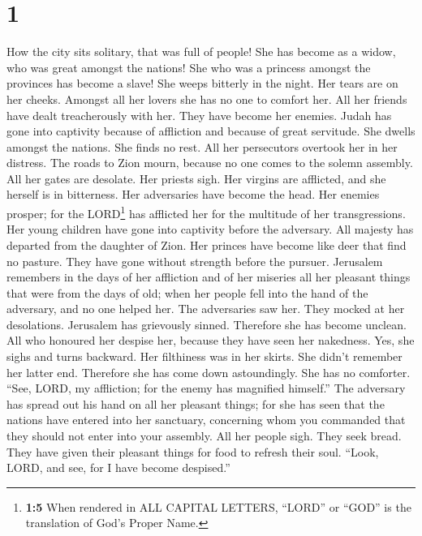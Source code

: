 \hypertarget{section}{%
\section{1}\label{section}}

 How the city sits solitary, that was full of people! She
has become as a widow, who was great amongst the nations! She who was a
princess amongst the provinces has become a slave!  She
weeps bitterly in the night. Her tears are on her cheeks. Amongst all
her lovers she has no one to comfort her. All her friends have dealt
treacherously with her. They have become her enemies. 
Judah has gone into captivity because of affliction and because of great
servitude. She dwells amongst the nations. She finds no rest. All her
persecutors overtook her in her distress.  The roads to
Zion mourn, because no one comes to the solemn assembly. All her gates
are desolate. Her priests sigh. Her virgins are afflicted, and she
herself is in bitterness.  Her adversaries have become the
head. Her enemies prosper; for the LORD\footnote{\textbf{1:5} When
  rendered in ALL CAPITAL LETTERS, ``LORD'' or ``GOD'' is the
  translation of God's Proper Name.} has afflicted her for the multitude
of her transgressions. Her young children have gone into captivity
before the adversary.  All majesty has departed from the
daughter of Zion. Her princes have become like deer that find no
pasture. They have gone without strength before the pursuer.
 Jerusalem remembers in the days of her affliction and of
her miseries all her pleasant things that were from the days of old;
when her people fell into the hand of the adversary, and no one helped
her. The adversaries saw her. They mocked at her desolations.
 Jerusalem has grievously sinned. Therefore she has become
unclean. All who honoured her despise her, because they have seen her
nakedness. Yes, she sighs and turns backward.  Her
filthiness was in her skirts. She didn't remember her latter end.
Therefore she has come down astoundingly. She has no comforter. ``See,
LORD, my affliction; for the enemy has magnified himself.''
 The adversary has spread out his hand on all her
pleasant things; for she has seen that the nations have entered into her
sanctuary, concerning whom you commanded that they should not enter into
your assembly.  All her people sigh. They seek bread.
They have given their pleasant things for food to refresh their soul.
``Look, LORD, and see, for I have become despised.'' 
